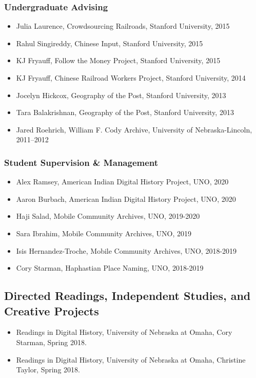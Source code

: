 \documentclass[10pt]{article}
\begin{document}
\subsubsection*{Undergraduate Advising}

\begin{itemize}
  \item Julia Laurence, Crowdsourcing Railroads, Stanford University, 2015
  \item Rahul Singireddy, Chinese Input, Stanford University, 2015
  \item KJ Fryauff, Follow the Money Project, Stanford University, 2015
  \item KJ Fryauff, Chinese Railroad Workers Project, Stanford University, 2014
  \item Jocelyn Hickcox, Geography of the Post, Stanford University, 2013
  \item Tara Balakrishnan, Geography of the Post, Stanford University, 2013
  \item Jared Roehrich, William F. Cody Archive, University of Nebraska-Lincoln, 2011--2012
\end{itemize}

\subsubsection*{Student Supervision \& Management}

\begin{itemize}
  \item Alex Ramsey, American Indian Digital History Project, UNO, 2020
  \item Aaron Burbach, American Indian Digital History Project, UNO, 2020
  \item Haji Salad, Mobile Community Archives, UNO, 2019-2020
  \item Sara Ibrahim, Mobile Community Archives, UNO, 2019
  \item Isis Hernandez-Troche, Mobile Community Archives, UNO, 2018-2019
  \item Cory Starman, Haphastian Place Naming, UNO, 2018-2019
\end{itemize}

\subsection*{Directed Readings, Independent Studies, and Creative Projects}

\begin{itemize}
  \item Readings in Digital History, University of Nebraska at Omaha, Cory Starman, Spring 2018.
  \item Readings in Digital History, University of Nebraska at Omaha, Christine Taylor, Spring 2018.
\end{itemize}
\end{document}
